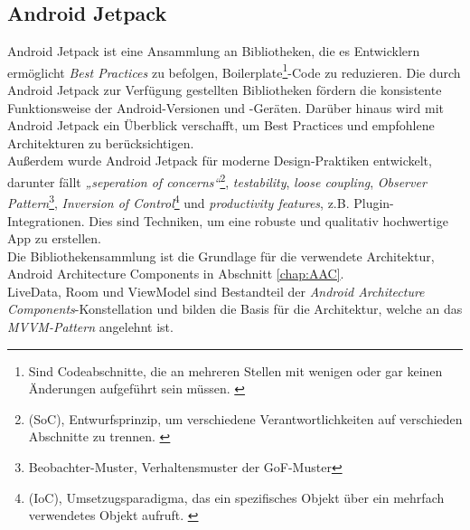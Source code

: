 \subsection{Android Jetpack}
\label{sec:androidjetpack}
Android Jetpack ist eine Ansammlung an Bibliotheken, die es Entwicklern ermöglicht \textit{Best Practices} zu befolgen, 
Boilerplate\footnote{Sind Codeabschnitte, die an mehreren Stellen mit wenigen oder gar keinen Änderungen aufgeführt sein müssen. \cite{boilerplate.2019m}}-Code 
zu reduzieren.
Die durch Android Jetpack zur Verfügung gestellten Bibliotheken fördern die konsistente Funktionsweise der 
Android-Versionen und -Geräten. Darüber hinaus wird mit Android Jetpack ein Überblick verschafft, um Best Practices und empfohlene 
Architekturen zu berücksichtigen.
\\ 
Außerdem wurde Android Jetpack für moderne Design-Praktiken entwickelt, darunter fällt \textit{„seperation of concerns“}\footnote{(SoC), Entwurfsprinzip, um verschiedene Verantwortlichkeiten auf 
verschieden Abschnitte zu trennen. \cite{soc.2019a}}, \textit{testability}, \textit{loose coupling}, \textit{Observer Pattern}\footnote{Beobachter-Muster, Verhaltensmuster der GoF-Muster}, 
\textit{Inversion of Control}\footnote{(IoC), Umsetzugsparadigma, das ein spezifisches Objekt über ein mehrfach verwendetes Objekt aufruft. \cite{ioc.2020}} und 
\textit{productivity features}, z.B. Plugin-Integrationen. Dies sind Techniken, um eine robuste und qualitativ hochwertige App zu erstellen.
\\ 
Die Bibliothekensammlung ist die Grundlage für die verwendete Architektur, Android Architecture Components in Abschnitt \ref{chap:AAC}.
\\ 
\linebreak
LiveData, Room und ViewModel sind Bestandteil der \textit{Android Architecture Components}-Konstellation 
und bilden die Basis für die Architektur, welche an das \textit{MVVM-Pattern} angelehnt ist.

